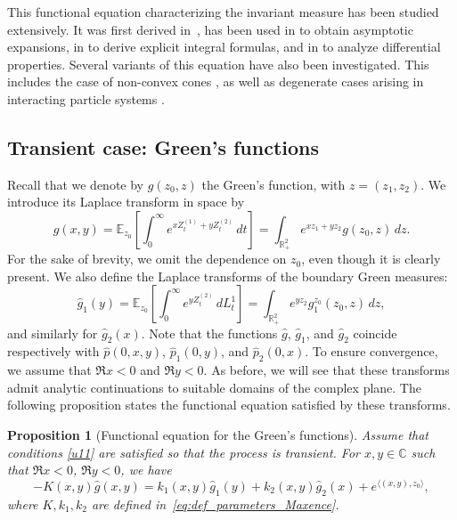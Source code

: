 \documentclass[11pt]{article}
\newcommand\citeS[1]{\cite{#1}}
\newtheorem{prop}[thm]{Proposition}
\theoremstyle{definition}
\begin{document}
This functional equation characterizing the invariant measure has been studied extensively. It was first derived in~\cite{dai_reflecting_2011}, has been used in \citeS{franceschi_kourkova_asymptotic_2017} to obtain asymptotic expansions, in \cite{franceschi_raschel_integral_2019} to derive explicit integral formulas, and in \cite{franceschi_bousquet_melou_price_hardouin_raschel_stationary_2023} to analyze differential properties.
Several variants of this equation have also been investigated. This includes the case of non-convex cones \citeS{franceschi_fayolle_raschel_fourier_transform_indagationes_2022,franceschi_fayolle_raschel_non_convex_mprf_2022}, as well as degenerate cases arising in interacting particle systems \citeS{franceschi_ichiba_karatzas_raschel_degenerate_2024,
franceschi_degenerate_asym_2025}.

\subsection{Transient case: Green's functions}

Recall that we denote by
$g(z_0,z)$ the Green's function, with $z=(z_1,z_2)$.
We introduce its Laplace transform in space by
\begin{equation}
\label{eq:Lap_green}
\widehat g (x,y)
= \mathbb{E}_{z_0} \!\left[ \int_0^\infty e^{x Z_t^{(1)}+y Z_t^{(2)} } \, dt \right]=
\int_{\mathbb R_+^2} e^{x z_1+yz_2} g(z_0,z)\,dz .
\end{equation}
For the sake of brevity, we omit the dependence on $z_0$, even though it is clearly present.
We also define the Laplace transforms of the boundary Green measures:
\begin{equation}
\label{eq:Lap_green1}
\widehat g_1(y)
=
\mathbb{E}_{z_0}\!\left[\int_0^\infty e^{y Z_t^{(2)}}\, dL_t^1\right]=
\int_{\mathbb R_+^2} e^{yz_2} g_1^{z_0}(z_0,z)\,dz ,
\end{equation}
and similarly for $\widehat g_2(x)$.
Note that the functions $\widehat g$, $\widehat g_1$, and $\widehat g_2$ coincide respectively with $\widehat p(0,x,y)$, $\widehat p_1(0,y)$, and $\widehat p_2(0,x)$.
To ensure convergence, we assume that $\Re x<0$ and $\Re y<0$. As before, we will see that these transforms admit analytic continuations to suitable domains of the complex plane.
The following proposition states the functional equation satisfied by these transforms.

\begin{prop}[Functional equation for the Green's functions] Assume that conditions \eqref{u11} are satisfied so that the process is transient.
For $x,y\in\mathbb{C}$ such that $\Re x<0$, $\Re y<0$, we have
\begin{equation}
\label{eq:Petit-24}
- K(x,y)\widehat g(x,y)
=
k_1(x,y)\widehat g_1(y)
+
k_2(x,y)\widehat g_2(x)
+
e^{\langle (x,y),z_0\rangle},
\end{equation}
where $K,k_1,k_2$ are defined in~\eqref{eq:def_parameters_Maxence}.
\end{prop}
\end{document}
